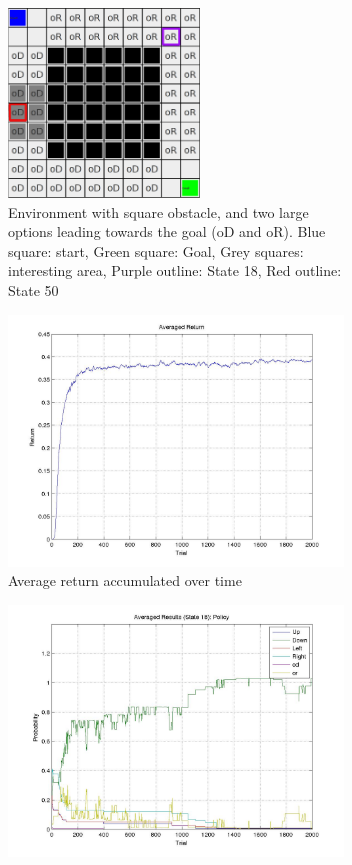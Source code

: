 \documentclass{acm_proc_article-sp}
\begin{document}
\begin{figure}[!htbp]
  \begin{subfigure}[h]{.4\textwidth}
  	\centering
    \includegraphics[width=2in]{ops.png}
    \caption{Environment with square obstacle, and two large options leading towards the goal (oD and oR). Blue square: start, Green square: Goal, Grey squares: interesting area, Purple outline: State 18, Red outline: State 50}
  \end{subfigure}\hfill
  \begin{subfigure}[h]{.45\textwidth}
  \centering
    \includegraphics[width=3.5in]{return.jpeg}
    \caption{Average return accumulated over time}
  \end{subfigure}
  \hfill
  \begin{subfigure}[h]{.45\textwidth}
  \centering
    \includegraphics[width=3.5in]{pol18.jpeg}

\end{subfigure}
\end{figure}
\end{document}
